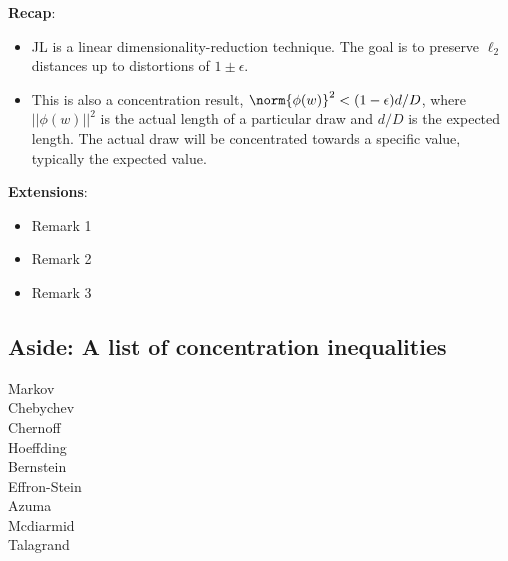 \noindent\textbf{Recap}: 

\begin{itemize}
\item JL is a linear dimensionality-reduction technique. The goal is
  to preserve $\ell_{2}$ distances up to distortions of $1\pm
  \epsilon$. 

\item This is also a concentration result, $\norm{\phi(w)}^{2} <
  (1-\epsilon)d/D$, where $||\phi(w)||^{2}$ is the actual length of a
  particular draw and $d/D$ is the expected length. The actual draw
  will be concentrated towards a specific value, typically the
  expected value.  

\end{itemize}

\textbf{Extensions}:
\begin{itemize}
  \item Remark 1
  \item Remark 2
  \item Remark 3
\end{itemize}

\subsection{Aside: A list of concentration inequalities}
\begin{centering}
Markov \\
Chebychev \\
Chernoff \\
Hoeffding \\
Bernstein \\
Effron-Stein \\
Azuma \\
Mcdiarmid \\
Talagrand \\
\end{centering}
